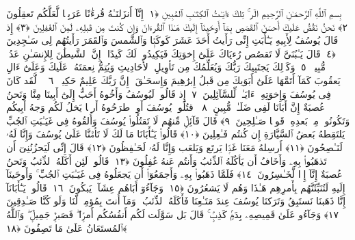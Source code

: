 
  
    
  
    
    

\nopagebreak
  بِسمِ ٱللَّهِ ٱلرَّحمَـٰنِ ٱلرَّحِيمِ
  الٓر ۚ تِلكَ ءَايَـٰتُ ٱلكِتَـٰبِ ٱلمُبِينِ ﴿١﴾
 إِنَّآ أَنزَلنَـٰهُ قُرءَٰنًا عَرَبِيًّۭا لَّعَلَّكُم تَعقِلُونَ ﴿٢﴾
 نَحنُ نَقُصُّ عَلَيكَ أَحسَنَ ٱلقَصَصِ بِمَآ أَوحَينَآ إِلَيكَ هَـٰذَا ٱلقُرءَانَ وَإِن كُنتَ مِن قَبلِهِۦ لَمِنَ ٱلغَٰفِلِينَ ﴿٣﴾
 إِذ قَالَ يُوسُفُ لِأَبِيهِ يَـٰٓأَبَتِ إِنِّى رَأَيتُ أَحَدَ عَشَرَ كَوكَبًۭا وَٱلشَّمسَ وَٱلقَمَرَ رَأَيتُهُم لِى سَـٰجِدِينَ ﴿٤﴾
 قَالَ يَـٰبُنَىَّ لَا تَقصُص رُءيَاكَ عَلَىٰٓ إِخوَتِكَ فَيَكِيدُوا۟ لَكَ كَيدًا ۖ إِنَّ ٱلشَّيطَٰنَ لِلإِنسَـٰنِ عَدُوٌّۭ مُّبِينٌۭ ﴿٥﴾
 وَكَذَٟلِكَ يَجتَبِيكَ رَبُّكَ وَيُعَلِّمُكَ مِن تَأوِيلِ ٱلأَحَادِيثِ وَيُتِمُّ نِعمَتَهُۥ عَلَيكَ وَعَلَىٰٓ ءَالِ يَعقُوبَ كَمَآ أَتَمَّهَا عَلَىٰٓ أَبَوَيكَ مِن قَبلُ إِبرَٰهِيمَ وَإِسحَـٰقَ ۚ إِنَّ رَبَّكَ عَلِيمٌ حَكِيمٌۭ ﴿٦﴾
 ۞ لَّقَد كَانَ فِى يُوسُفَ وَإِخوَتِهِۦٓ ءَايَـٰتٌۭ لِّلسَّآئِلِينَ ﴿٧﴾
 إِذ قَالُوا۟ لَيُوسُفُ وَأَخُوهُ أَحَبُّ إِلَىٰٓ أَبِينَا مِنَّا وَنَحنُ عُصبَةٌ إِنَّ أَبَانَا لَفِى ضَلَـٰلٍۢ مُّبِينٍ ﴿٨﴾
 ٱقتُلُوا۟ يُوسُفَ أَوِ ٱطرَحُوهُ أَرضًۭا يَخلُ لَكُم وَجهُ أَبِيكُم وَتَكُونُوا۟ مِنۢ بَعدِهِۦ قَومًۭا صَـٰلِحِينَ ﴿٩﴾
 قَالَ قَآئِلٌۭ مِّنهُم لَا تَقتُلُوا۟ يُوسُفَ وَأَلقُوهُ فِى غَيَـٰبَتِ ٱلجُبِّ يَلتَقِطهُ بَعضُ ٱلسَّيَّارَةِ إِن كُنتُم فَـٰعِلِينَ ﴿١٠﴾
 قَالُوا۟ يَـٰٓأَبَانَا مَا لَكَ لَا تَأمَ۫نَّا عَلَىٰ يُوسُفَ وَإِنَّا لَهُۥ لَنَـٰصِحُونَ ﴿١١﴾
 أَرسِلهُ مَعَنَا غَدًۭا يَرتَع وَيَلعَب وَإِنَّا لَهُۥ لَحَـٰفِظُونَ ﴿١٢﴾
 قَالَ إِنِّى لَيَحزُنُنِىٓ أَن تَذهَبُوا۟ بِهِۦ وَأَخَافُ أَن يَأكُلَهُ ٱلذِّئبُ وَأَنتُم عَنهُ غَٰفِلُونَ ﴿١٣﴾
 قَالُوا۟ لَئِن أَكَلَهُ ٱلذِّئبُ وَنَحنُ عُصبَةٌ إِنَّآ إِذًۭا لَّخَـٰسِرُونَ ﴿١٤﴾
 فَلَمَّا ذَهَبُوا۟ بِهِۦ وَأَجمَعُوٓا۟ أَن يَجعَلُوهُ فِى غَيَـٰبَتِ ٱلجُبِّ ۚ وَأَوحَينَآ إِلَيهِ لَتُنَبِّئَنَّهُم بِأَمرِهِم هَـٰذَا وَهُم لَا يَشعُرُونَ ﴿١٥﴾
 وَجَآءُوٓ أَبَاهُم عِشَآءًۭ يَبكُونَ ﴿١٦﴾
 قَالُوا۟ يَـٰٓأَبَانَآ إِنَّا ذَهَبنَا نَستَبِقُ وَتَرَكنَا يُوسُفَ عِندَ مَتَـٰعِنَا فَأَكَلَهُ ٱلذِّئبُ ۖ وَمَآ أَنتَ بِمُؤمِنٍۢ لَّنَا وَلَو كُنَّا صَـٰدِقِينَ ﴿١٧﴾
 وَجَآءُو عَلَىٰ قَمِيصِهِۦ بِدَمٍۢ كَذِبٍۢ ۚ قَالَ بَل سَوَّلَت لَكُم أَنفُسُكُم أَمرًۭا ۖ فَصَبرٌۭ جَمِيلٌۭ ۖ وَٱللَّهُ ٱلمُستَعَانُ عَلَىٰ مَا تَصِفُونَ ﴿١٨﴾
